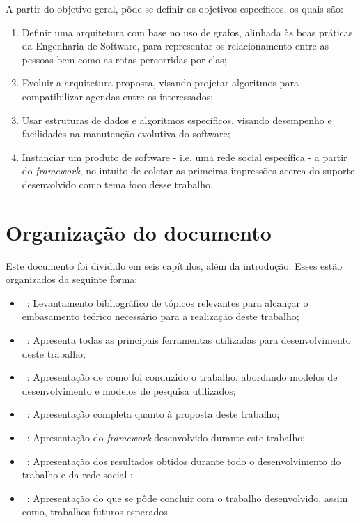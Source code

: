 A partir do objetivo geral, pôde-se definir os objetivos específicos, os quais são:

\begin{enumerate}
	\item Definir uma arquitetura com base no uso de grafos, alinhada às boas práticas da Engenharia de Software, para representar os relacionamento entre as pessoas bem como as rotas percorridas por elas;
	\item Evoluir a arquitetura proposta, visando projetar algoritmos para compatibilizar agendas entre os interessados;
	\item Usar estruturas de dados e algoritmos específicos, visando desempenho e facilidades na manutenção evolutiva do software;
	\item Instanciar um produto de software - i.e. uma rede social específica - a partir do \textit{framework}, no intuito de coletar as primeiras impressões acerca do suporte desenvolvido como tema foco desse trabalho.
\end{enumerate}

\section{Organização do documento}

Este documento foi dividido em seis capítulos, além da introdução. Esses estão organizados da seguinte forma:

\begin{itemize}
	\item ~: Levantamento bibliográfico de tópicos relevantes para alcançar o embasamento teórico necessário para a realização deste trabalho;
	\item ~: Apresenta todas as principais ferramentas utilizadas para desenvolvimento deste trabalho;
	\item ~: Apresentação de como foi conduzido o trabalho, abordando modelos de desenvolvimento e modelos de pesquisa utilizados;
	\item ~: Apresentação completa quanto à proposta deste trabalho;
	\item ~: Apresentação do \textit{framework} desenvolvido durante este trabalho;
	\item ~: Apresentação dos resultados obtidos durante todo o desenvolvimento do trabalho e da rede social ;
	\item ~: Apresentação do que se pôde concluir com o trabalho desenvolvido, assim como, trabalhos futuros esperados.
\end{itemize}
